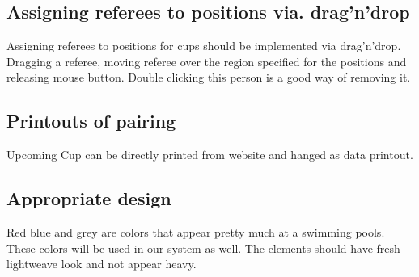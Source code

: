 \subsection*{Assigning referees to positions via. drag'n'drop}
\par
Assigning referees to positions for cups should be implemented via drag'n'drop. Dragging a referee, moving referee over the region specified for the positions and releasing mouse button. Double clicking this person is a good way of removing it.
\subsection*{Printouts of pairing}
Upcoming Cup can be directly printed from website and hanged as data printout. 
\subsection*{Appropriate design}
\par
Red blue and grey are colors that appear pretty much at a swimming pools. These colors will be used in our system as well. The elements should have fresh lightweave look and not appear heavy.
